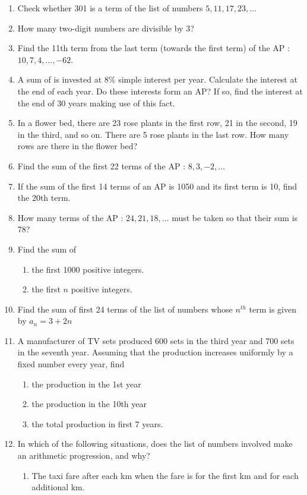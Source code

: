 \begin{enumerate}[label=\thesubsection.\arabic*, ref=\thesubsection.\theenumi]
\item Check whether 301 is a term of the list of numbers $5,  11,  17,  23,  \dots$
\item How many two-digit numbers are divisible by 3?
\item Find the 11th term from the last term (towards the first term) of the
AP : $10,  7,  4,  \dots,  - 62$.
\item A sum of  is invested at $8\%$ simple interest per year. Calculate the interest at the end of each year. Do these interests form an AP? If so,  find the interest at the end of 30 years making use of this fact.
\item In a flower bed,  there are 23 rose plants in the first row,  21 in the
second,  19 in the third,  and so on. There are 5 rose plants in the last row. How many rows are there in the flower bed?
\item Find the sum of the first 22 terms of the AP : $8,  3,  -2,  \dots$
\item If the sum of the first 14 terms of an AP is 1050 and its first term is 10,  find the 20th term.
\item How many terms of the AP : $24,  21,  18,  \dots$ must be taken so that their
sum is 78?
\item Find the sum of 
\begin{enumerate}
\item the first 1000 positive integers.
\item the first $n$ positive integers.
\end{enumerate}
\item Find the sum of first 24 terms of the list of numbers whose $n^{th}$ term is given by $a_n = 3 + 2n$
\item A manufacturer of TV sets produced 600 sets in the third year and 700
sets in the seventh year. Assuming that the production increases uniformly by a fixed number every year,  find 
\begin{enumerate}
\item   the production in the 1st year
\item	the production in the 10th year
\item the total production in first 7 years.
\end{enumerate}
\item In which of the following situations,  does the list of numbers involved make an arithmetic progression,  and why?
\begin{enumerate}
\item The taxi fare after each km when the fare is  for the first km and  for each additional km.

\end{enumerate}
\end{enumerate}
